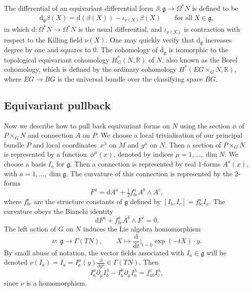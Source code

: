 \documentclass[10pt,a4paper]{amsart}
\newcommand{\g}{{\mathfrak{g}}}
\newcommand{\R}{{\mathbb{R}}}
\newcommand{\1}{{\mathbb{1}}}
\newcommand{\lto}{\longrightarrow}
\def \d{\mathrm{d}}
\numberwithin{equation}{section}
\begin{document}
The differential of an equivariant differential form $\beta\colon \g\to\Omega^\ast N$ is defined to be
\begin{align}\label{equivariant-exterior-derivative}
\d_\g\beta(X) = \d(\beta(X))-\iota_{\nu(X)}\beta(X)\qquad\text{for all}\ X\in \g,
\end{align}
in which $\d\colon \Omega^\ast N\to\Omega^\ast N$ is the usual differential, and $\iota_{\nu(X)}$ is contraction with respect to the Killing field $\nu(X)$. One may quickly verify that $\d_\g$ increases degree by one and squares to 0. The cohomology of $\d_\g$ is isomorphic to the topological equivariant cohomology $H^\ast_G(N,\R)$ of $N$, also known as the Borel cohomology, which is defined by the ordinary cohomology $H^\ast(EG\times_GN,\R)$, where $EG\to BG$ is the universal bundle over the classifying space $BG$.

\subsection{Equivariant pullback}
Now we describe how to pull back equivariant forms on $N$ using the section $\phi$ of $P\times_GN$ and connection $A$ on $P$. We choose a local trivialisation of our principal bundle $P$ and local coordinates~$x^\lambda$ on $M$ and $y^\mu$ on $N$. Then a section of $P\times_G N$ is represented by a function~$\phi^\mu(x)$, denoted by indices $\mu=1,\dots,\dim N$. We choose a basis $I_a$ for $\g$. Then a connection is represented by real 1-forms $A^a(x)$, with $a=1,\dots,\dim \g$. The curvature of this connection is represented by the 2-forms
\begin{equation*}
F^a=\d A^a+\tfrac{1}{2}f^{a}_{bc}A^b\wedge A^c,
\end{equation*}
where $f^a_{bc}$ are the structure constants of $\g$ defined by $[I_b,I_c]=f^a_{bc}I_a$. The curvature obeys the Bianchi identity
\begin{equation}\label{bianchi}
\d F^a + f^a_{bc}A^b\wedge F^c = 0.
\end{equation}
The left action of $G$ on $N$ induces the Lie algebra homomorphism
\begin{equation}\label{nu-definition}
\nu\colon \ \g\lto\Gamma(TN),\qquad X \mapsto \frac{\d}{\d t}\Big|_{t=0}\exp(-tX)\cdot y.
\end{equation}
By small abuse of notation, the vector fields associated with $I_a\in\g$ will be denoted $\nu(I_a)=I_a=I_a^\mu(y)\frac{\partial}{\partial y^\mu}\in\Gamma(TN)$. Then
\begin{equation}\label{Lie bracket}
I_a^\mu\partial_\mu I_b^\lambda - I_b^\mu \partial_\mu I_a^\lambda = f_{ab}^cI_c^\lambda,
\end{equation}
since $\nu$ is a homomorphism.
\end{document}
